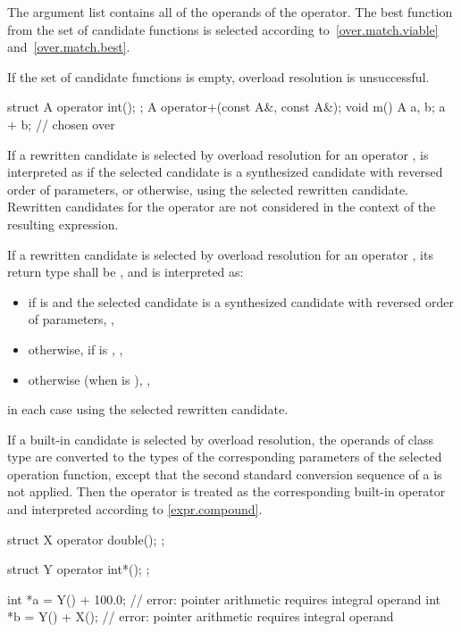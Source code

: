 \pnum
The argument list contains all of the
operands of the operator.
The best function from the set of candidate functions is selected
according to~\ref{over.match.viable}
and~\ref{over.match.best}.
\begin{footnote}
If the set of candidate functions is empty,
overload resolution is unsuccessful.
\end{footnote}
\begin{example}
\begin{codeblock}
struct A {
  operator int();
};
A operator+(const A&, const A&);
void m() {
  A a, b;
  a + b;                        //  chosen over 
}
\end{codeblock}
\end{example}

\pnum
If a rewritten  candidate
is selected by overload resolution
for an operator ,
is interpreted as
if the selected candidate is a synthesized candidate
with reversed order of parameters,
or  otherwise,
using the selected rewritten  candidate.
Rewritten candidates for the operator 
are not considered in the context of the resulting expression.

\pnum
If a rewritten  candidate
is selected by overload resolution
for an operator ,
its return type shall be \cv{} , and
 is interpreted as:
\begin{itemize}
\item
if  is \tcode{!=}
and the selected candidate is a synthesized candidate
with reversed order of parameters,
,
\item
otherwise, if  is \tcode{!=},
,
\item
otherwise (when  is \tcode{==}),
,
\end{itemize}
in each case using the selected rewritten  candidate.

\pnum
If a built-in candidate is selected by overload resolution, the
operands of class type are converted to the types of the corresponding parameters
of the selected operation function, except that the second standard conversion
sequence of a  is not applied.
Then the operator is treated as the corresponding
built-in operator and interpreted according to \ref{expr.compound}.
\begin{example}
\begin{codeblock}
struct X {
  operator double();
};

struct Y {
  operator int*();
};

int *a = Y() + 100.0;           // error: pointer arithmetic requires integral operand
int *b = Y() + X();             // error: pointer arithmetic requires integral operand
\end{codeblock}
\end{example}

